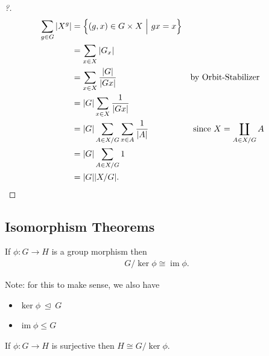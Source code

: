 \begin{proof}[?]

\begin{align*}
\sum_{g\in G} {\left\lvert {X^g} \right\rvert}
&= \left\{{ (g,x) \in G \times X {~\mathrel{\Big|}~}gx = x }\right\} \\
&= \sum_{x\in X} {\left\lvert {G_x} \right\rvert} \\
&= \sum_{x\in X} {{\left\lvert {G} \right\rvert}\over {\left\lvert {Gx} \right\rvert}  }  && \text{by Orbit-Stabilizer} \\
&= {\left\lvert {G} \right\rvert} \sum_{x\in X} {1 \over {\left\lvert {Gx} \right\rvert}  }  \\
&= {\left\lvert {G} \right\rvert} \sum_{A\in X/G} \sum_{x\in A} {1\over {\left\lvert {A} \right\rvert} } && \text{ since } X = \displaystyle\coprod_{A \in X/G} A \\
&= {\left\lvert {G} \right\rvert} \sum_{A\in X/G} 1 \\
&= {\left\lvert {G} \right\rvert} {\left\lvert {X/G} \right\rvert}  
.\end{align*}

\end{proof}

\hypertarget{isomorphism-theorems}{%
\subsection{Isomorphism Theorems}\label{isomorphism-theorems}}

\begin{theorem}

If \(\phi:G\to H\) is a group morphism then
\begin{align*}G/\ker \phi \cong \operatorname{im}\phi.\end{align*}

Note: for this to make sense, we also have

\begin{itemize}
\tightlist
\item
  \(\ker \phi {~\trianglelefteq~}G\)
\item
  \(\operatorname{im}\phi \leq G\)
\end{itemize}

\end{theorem}

\begin{corollary}

If \(\phi: G\to H\) is surjective then \(H\cong G/\ker \phi\).

\end{corollary}

